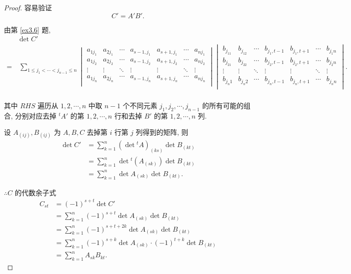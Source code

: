 \documentclass[color=black,device=normal,lang=cn,mode=geye]{elegantnote}
\begin{document}
\begin{proof}
    容易验证
    \[C'=A'B'.\]

    由第 \ref{ex3.6} 题,
    \setlength\arraycolsep{2pt}
    \begin{align*}
        & \det C' \\
        = & \ \sum\limits_{1\leq j_1<\cdots<j_{n-1}\leq n}\begin{vmatrix}
        a_{1j_1} & a_{2j_1} & \cdots & a_{s-1,j_1} & a_{s+1,j_1} & \cdots & a_{nj_1} \\
        a_{1j_2} & a_{2j_2} & \cdots & a_{s-1,j_2} & a_{s+1,j_2} & \cdots & a_{nj_2} \\
        \vdots   & \vdots   & \ddots & \vdots      & \vdots      & \ddots & \vdots \\
        a_{1j_n} & a_{2j_n} & \cdots & a_{s-1,j_n} & a_{s+1,j_n} & \cdots & a_{nj_n} \\
    \end{vmatrix}\begin{vmatrix}
        b_{j_11} & b_{j_12} & \cdots  & b_{j_1,t-1}  & b_{j_1,t+1} & \cdots & b_{j_1n} \\
        b_{j_21} & b_{j_22} & \cdots  & b_{j_2,t-1}  & b_{j_2,t+1} & \cdots & b_{j_2n} \\
        \vdots   & \vdots   & \ddots  & \vdots   & \vdots  & \ddots & \vdots \\
        b_{j_n1} & b_{j_n2} & \cdots  & b_{j_n,t-1}  & b_{j_n,t+1} & \cdots & b_{j_nn} \\
    \end{vmatrix}. \\
    \end{align*}

    其中 $RHS$ 遍历从 $1,2,\cdots,n$ 中取 $n-1$ 个不同元素 $j_1,j_2,\cdots,j_{n-1}$ 的所有可能的组合, 分别对应去掉 ${}^tA'$ 的第 $1,2,\cdots,n$ 行和去掉 $B'$ 的第 $1,2,\cdots,n$ 列.

    设 $A_{(ij)},B_{(ij)}$ 为 $A,B,C$ 去掉第 $i$ 行第 $j$ 列得到的矩阵, 则
    \begin{align*}
        \det C' & =\sum\limits_{k=1}^n(\det{}^tA)_{(ks)}\det B_{(kt)} \\
        & =\sum\limits_{k=1}^n\det{}^t(A_{(sk)})\det B_{(kt)} \\
        & =\sum\limits_{k=1}^n\det A_{(sk)}\det B_{(kt)}.
    \end{align*}

    $\therefore C$ 的代数余子式
    \begin{align*}
        C_{st} & =(-1)^{s+t}\det C' \\
        & =\sum\limits_{k=1}^n(-1)^{s+t}\det A_{(sk)}\det B_{(kt)} \\
        & =\sum\limits_{k=1}^n(-1)^{s+t+2k}\det A_{(sk)}\det B_{(kt)} \\
        & =\sum\limits_{k=1}^n(-1)^{s+k}\det A_{(sk)}\cdot(-1)^{t+k}\det B_{(kt)} \\
        & =\sum\limits_{k=1}^nA_{sk}B_{kt}.
    \end{align*}


\end{proof}
\end{document}
